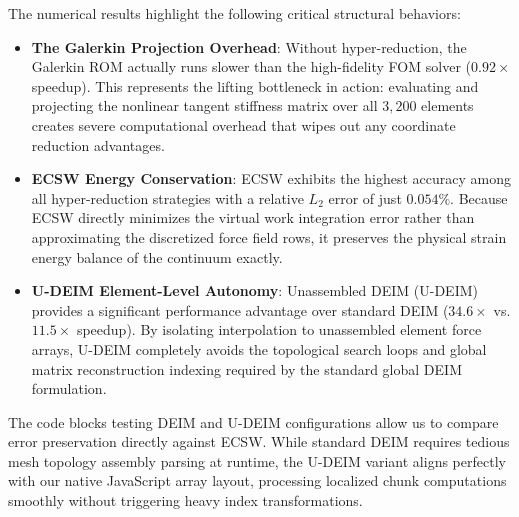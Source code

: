 The numerical results highlight the following critical structural behaviors:
\begin{itemize}
        \item \textbf{The Galerkin Projection Overhead}: Without hyper-reduction, the Galerkin ROM actually runs slower than the high-fidelity FOM solver ($0.92\times$ speedup). This represents the lifting bottleneck in action: evaluating and projecting the nonlinear tangent stiffness matrix over all $3,200$ elements creates severe computational overhead that wipes out any coordinate reduction advantages.
        
        \item \textbf{ECSW Energy Conservation}: ECSW exhibits the highest accuracy among all hyper-reduction strategies with a relative $L_2$ error of just $0.054\%$. Because ECSW directly minimizes the virtual work integration error rather than approximating the discretized force field rows, it preserves the physical strain energy balance of the continuum exactly.
        
        \item \textbf{U-DEIM Element-Level Autonomy}: Unassembled DEIM (U-DEIM) provides a significant performance advantage over standard DEIM ($34.6\times$ vs. $11.5\times$ speedup). By isolating interpolation to unassembled element force arrays, U-DEIM completely avoids the topological search loops and global matrix reconstruction indexing required by the standard global DEIM formulation.
\end{itemize}

\begin{devnote}
The code blocks testing DEIM and U-DEIM configurations allow us to compare error preservation directly against ECSW. While standard DEIM requires tedious mesh topology assembly parsing at runtime, the U-DEIM variant aligns perfectly with our native JavaScript array layout, processing localized chunk computations smoothly without triggering heavy index transformations.
\end{devnote}